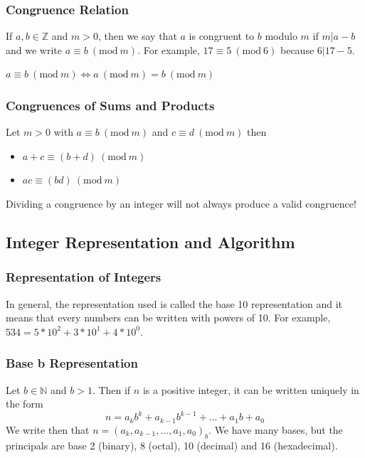 \documentclass{article}
\newcommand{\Mod}[1]{\ (\mathrm{mod}\ #1)}
\begin{document}
\subsubsection{Congruence Relation} If $ a,b \in \mathbb{Z} $ and $ m > 0 $, then we say that $ a $ is congruent to $ b $ modulo $ m $ if $ m|a-b $ and we write $ a \equiv b \Mod m $. For example, $ 17 \equiv 5 \Mod 6 $ because $ 6 | 17-5 $.

\begin{tcolorbox}[sharp corners, colback=green!30, colframe=green!80!blue, title=Congruence Equivalence]
$ a \equiv b \Mod m \Leftrightarrow a \Mod m = b \Mod m $
\end{tcolorbox}

\subsubsection{Congruences of Sums and Products}
\begin{tcolorbox}[sharp corners, colback=green!30, colframe=green!80!blue, title=Congruence of Sums and Products]
Let $ m > 0 $ with $ a \equiv b \Mod m $ and $ c \equiv d \Mod m $ then
\begin{itemize}
\item $ a + c \equiv (b + d) \Mod m $
\item $ ac \equiv (bd) \Mod m $
\end{itemize}
\end{tcolorbox}

\begin{tcolorbox}[width=12.1cm, leftrule=3mm]
Dividing a congruence by an integer will not always produce a valid congruence!
\end{tcolorbox}

\subsection{Integer Representation and Algorithm}
\subsubsection{Representation of Integers} In general, the representation used is called the base 10 representation and it means that every numbers can be written with powers of 10. For example, $ 534 = 5*10^2 + 3*10^1 + 4*10^0 $.

\subsubsection{Base b Representation} Let $ b \in \mathbb{N} $ and $ b > 1 $. Then if $ n $ is a positive integer, it can be written uniquely in the form
\begin{equation}
n = a_{k}b^{k} + a_{k-1}b^{k-1} + ... + a_{1}b + a_0
\end{equation} 
We write then that $ n = (a_{k},a_{k-1},...,a_1,a_0)_{b} $. We have many bases, but the principals are base 2 (binary), 8 (octal), 10 (decimal) and 16 (hexadecimal).
\end{document}
